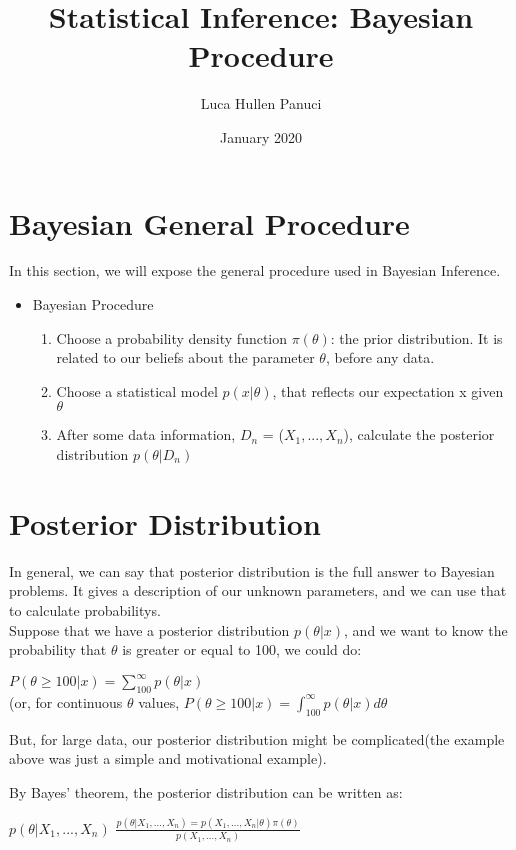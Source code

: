 \documentclass[oneside]{book}
\title{Statistical Inference:  Bayesian Procedure}
\author{Luca Hullen Panuci}
\date{January 2020}
\begin{document}
\maketitle

\section*{Bayesian General Procedure}

In this section, we will expose the general procedure used in Bayesian Inference. 
\begin{itemize}

    \item Bayesian Procedure
    
    \begin{enumerate}
        \item 
        Choose a probability density function $\pi(\theta)$: the prior distribution. It is related to our beliefs about the parameter $\theta$, before any data.
        
        \item Choose a statistical model $p(x|\theta)$, that reflects our expectation  x given $\theta$
        
        \item After some data information, $D_n$ = ($X_1,...,X_n$), calculate the posterior distribution $p(\theta|D_n)$
    \end{enumerate}
\end{itemize}
\section*{Posterior Distribution}

In general, we can say that posterior distribution is the full answer to Bayesian problems. It gives a description of our unknown parameters, and we can use that to calculate probabilitys.\\
Suppose that we have a posterior distribution $p(\theta | x)$, and we want to know the probability that $\theta$ is greater or equal to 100, we could do:

\begin{center}
    
    $P(\theta \geq 100|x) = \sum_{100}^{\infty} p(\theta|x)$
    \\
    \vspace*{0.5cm}(or, for continuous $\theta$ values,  $P(\theta \geq 100|x) = \int_{100}^{\infty}p(\theta|x)d\theta$
    
\end{center}

But, for large data, our posterior distribution might be complicated(the example above was just a simple and motivational example).

By Bayes' theorem, the posterior distribution can be written as:
\\
\begin{center}
  $p(\theta|X_1,...,X_n)$  $\frac{p(\theta|X_1,...,X_n) = p(X_1,...,X_n|\theta)\pi(\theta)}{p(X_1,...,X_n)}$
\end{center}
\end{document}
